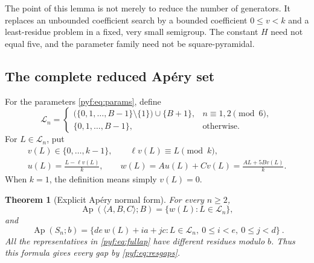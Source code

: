 \documentclass[11pt,a4paper]{article}
\numberwithin{equation}{section}
\newtheorem{theorem}{Theorem}[section]
\theoremstyle{definition}
\newcommand{\Ap}{\operatorname{Ap}}
\begin{document}
The point of this lemma is not merely to reduce the number of generators.
It replaces an unbounded coefficient search by a bounded coefficient
$0\leq v<k$ and a least-residue problem in a fixed, very small semigroup.
The constant $H$ need not equal five, and the parameter family need not be
square-pyramidal.

\subsection{The complete reduced Ap\'ery set}

For the parameters \eqref{pyf:eq:params}, define
\begin{equation}\label{pyf:eq:Lset}
\mathcal L_n=
\begin{cases}
\bigl(\{0,1,\ldots,B-1\}\setminus\{1\}\bigr)\cup\{B+1\},
   & n\equiv1,2\pmod6,\\
\{0,1,\ldots,B-1\},&\text{otherwise}.
\end{cases}
\end{equation}
For $L\in\mathcal L_n$, put
\begin{equation}\label{pyf:eq:vuw}
\begin{gathered}
v(L)\in\{0,\ldots,k-1\},\qquad \ell v(L)\equiv L\pmod k,\\
u(L)=\frac{L-\ell v(L)}k,\qquad
w(L)=Au(L)+Cv(L)=\frac{AL+5Bv(L)}k.
\end{gathered}
\end{equation}
When $k=1$, the definition means simply $v(L)=0$.

\begin{theorem}[Explicit Ap\'ery normal form]\label{pyf:thm:apery}
For every $n\geq2$,
\begin{equation}\label{pyf:eq:smallap}
\Ap(\langle A,B,C\rangle;B)=\{w(L):L\in\mathcal L_n\},
\end{equation}
and
\begin{equation}\label{pyf:eq:fullap}
\boxed{\ \Ap(S_n;b)=
\{de\,w(L)+ia+jc:L\in\mathcal L_n,\ 0\leq i<e,\ 0\leq j<d\}\ }.
\end{equation}
All the representatives in \eqref{pyf:eq:fullap} have different residues
modulo $b$. Thus this formula gives every gap by \eqref{pyf:eq:resgaps}.
\end{theorem}
\end{document}
